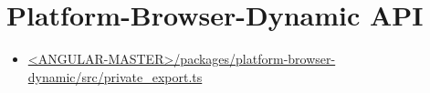 \section{Platform-Browser-Dynamic API}















\begin{itemize}
  \item \href{https://github.com/angular/angular/blob/master/packages/platform-browser-dynamic/src/private_export.ts}
        {<ANGULAR-MASTER>/packages/platform-browser-dynamic/src/private\_export.ts}
\end{itemize}



